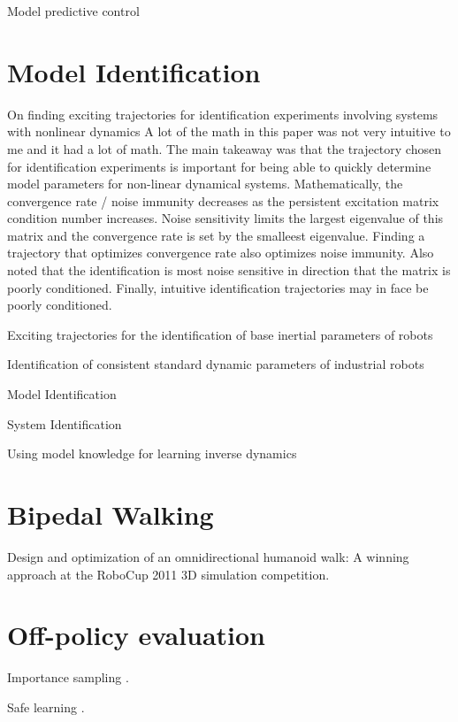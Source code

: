 \documentclass[12 pt]{article}
\begin{document}
Model predictive control


\section{Model Identification}

On finding exciting trajectories for identification experiments involving systems with nonlinear dynamics
A lot of the math in this paper was not very intuitive to me and it had a lot of math. The main takeaway was that the trajectory chosen for identification experiments is important for being able to quickly determine model parameters for non-linear dynamical systems. Mathematically, the convergence rate / noise immunity decreases as the persistent excitation matrix condition number increases. Noise sensitivity limits the largest eigenvalue of this matrix and the convergence rate is set by the smalleest eigenvalue. Finding a trajectory that optimizes convergence rate also optimizes noise immunity. Also noted that the identification is most noise sensitive in direction that the matrix is poorly conditioned. Finally, intuitive identification trajectories may in face be poorly conditioned.

Exciting trajectories for the identification of base inertial parameters of robots

Identification of consistent standard dynamic parameters of industrial robots

Model Identification

System Identification

Using model knowledge for learning inverse dynamics

\section{Bipedal Walking}

Design and optimization of an omnidirectional humanoid walk: A winning approach at the RoboCup 2011 3D simulation competition.

\section{Off-policy evaluation}

Importance sampling \cite{silver2014deterministic} \cite{levine2013guided}.

Safe learning \cite{thomas2015off-policy}.



\end{document}
